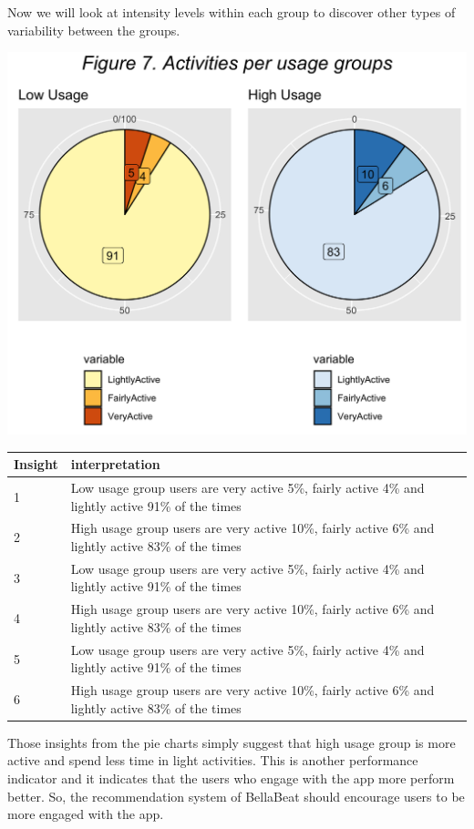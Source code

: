 \documentclass[
]{article}
\begin{document}
Now we will look at intensity levels within each group to discover other
types of variability between the groups.

\includegraphics[width=0.6\linewidth]{./figs/pies}

\begin{table}
\centering\begingroup\fontsize{14}{16}\selectfont

\begin{tabular}[t]{l|l}
\hline
Insight & interpretation\\
\hline
1 & Low usage group users are very active 5\%, fairly active 4\% and lightly active 91\% of the times\\
\hline
2 & High usage group users are very active 10\%, fairly active 6\% and lightly active 83\% of the times\\
\hline
3 & Low usage group users are very active 5\%, fairly active 4\% and lightly active 91\% of the times\\
\hline
4 & High usage group users are very active 10\%, fairly active 6\% and lightly active 83\% of the times\\
\hline
5 & Low usage group users are very active 5\%, fairly active 4\% and lightly active 91\% of the times\\
\hline
6 & High usage group users are very active 10\%, fairly active 6\% and lightly active 83\% of the times\\
\hline
\end{tabular}
\endgroup{}
\end{table}

Those insights from the pie charts simply suggest that high usage group
is more active and spend less time in light activities. This is another
performance indicator and it indicates that the users who engage with
the app more perform better. So, the recommendation system of BellaBeat
should encourage users to be more engaged with the app.
\end{document}
